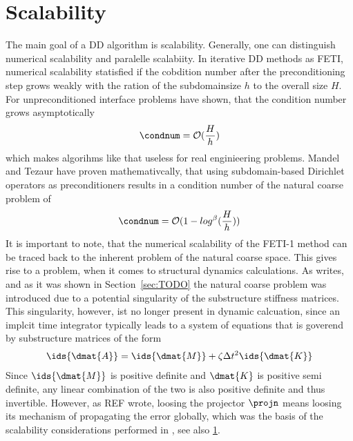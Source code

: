 \documentclass[preview]{standalone} %
\newcommand{\order}[1]{\mathcal{O}(#1)}
\begin{document}
\section{Scalability}\label{sec:scalability}
The main goal of a DD algorithm is scalability. Generally, one can distinguish numerical scalability and paralelle scalabiity. In iterative DD methods as FETI, numerical scalability statisfied if the cobdition number after the preconditioning step grows weakly with the ration of the subdomainsize $h$ to the overall size $H$.\\
For unpreconditioned interface problems \cite{Farhat1995ref1,Farhat1995ref1} have shown, that the condition number grows asymptotically
\begin{align}
\condnum=\order{\frac{H}{h}}
\label{eq:condnum_without_natural_cspace}
\end{align}
which makes algorihms like that useless for real enginieering problems. Mandel and Tezaur \cite{Farhat1995ref17} have proven mathemativcally, that using subdomain-based Dirichlet operators as preconditioners results in a condition number of the natural coarse problem of
\begin{align}
\condnum=\order{1-log^\beta(\frac{H}{h})}
\end{align}
\linebreak
It is important to note, that the numerical scalability of the FETI-1 method can be traced back to the inherent problem of the natural coarse space.
This gives rise to a problem, when it comes to structural dynamics calculations. As \cite{Farhat1998} writes, and as it was shown in Section~\ref{sec:TODO} the natural coarse problem was introduced due to a potential singularity of the substructure stiffness matrices.\\
This singularity, however, ist no longer present in dynamic calcuation, since an implcit time integrator typically leads to a system of equations that is goverend by substructure matrices of the form
\begin{align}
\ids{\dmat{A}}=\ids{\dmat{M}}+\zeta \Delta t^2\ids{\dmat{K}}
\end{align}
Since $\ids{\dmat{M}}$ is positive definite and $\dmat{K}$ is positive semi definite, any linear combination of the two is also positive definite and thus invertible. However, as REF wrote, loosing the projector $\projn$ means loosing its mechanism of propagating the error globally, which was the basis of the scalability considerations performed in \cite{TODO}, see also \ref{sec:scalability}. 
\end{document}
